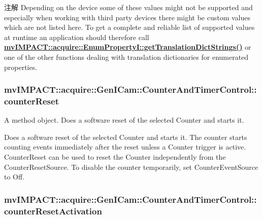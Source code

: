 \begin{DoxyNote}{注解}
Depending on the device some of these values might not be supported and especially when working with third party devices there might be custom values which are not listed here. To get a complete and reliable list of supported values at runtime an application should therefore call {\bfseries \hyperlink{classmv_i_m_p_a_c_t_1_1acquire_1_1_enum_property_i_a0ba6ccbf5ee69784d5d0b537924d26b6}{mv\+I\+M\+P\+A\+C\+T\+::acquire\+::\+Enum\+Property\+I\+::get\+Translation\+Dict\+Strings()}} or one of the other functions dealing with translation dictionaries for enumerated properties. 
\end{DoxyNote}
\hypertarget{classmv_i_m_p_a_c_t_1_1acquire_1_1_gen_i_cam_1_1_counter_and_timer_control_a8bb2c2964ae66f7250a37348e5b37ec6}{
\subsubsection[{counter\+Reset}]{ mv\+I\+M\+P\+A\+C\+T\+::acquire\+::\+Gen\+I\+Cam\+::\+Counter\+And\+Timer\+Control\+::counter\+Reset}}\label{classmv_i_m_p_a_c_t_1_1acquire_1_1_gen_i_cam_1_1_counter_and_timer_control_a8bb2c2964ae66f7250a37348e5b37ec6}


A method object. Does a software reset of the selected Counter and starts it. 

Does a software reset of the selected Counter and starts it. The counter starts counting events immediately after the reset unless a Counter trigger is active. Counter\+Reset can be used to reset the Counter independently from the Counter\+Reset\+Source. To disable the counter temporarily, set Counter\+Event\+Source to Off. \hypertarget{classmv_i_m_p_a_c_t_1_1acquire_1_1_gen_i_cam_1_1_counter_and_timer_control_a94c6a18dd21c201e57240f0d7427958f}{
\subsubsection[{counter\+Reset\+Activation}]{ mv\+I\+M\+P\+A\+C\+T\+::acquire\+::\+Gen\+I\+Cam\+::\+Counter\+And\+Timer\+Control\+::counter\+Reset\+Activation}}\label{classmv_i_m_p_a_c_t_1_1acquire_1_1_gen_i_cam_1_1_counter_and_timer_control_a94c6a18dd21c201e57240f0d7427958f}


